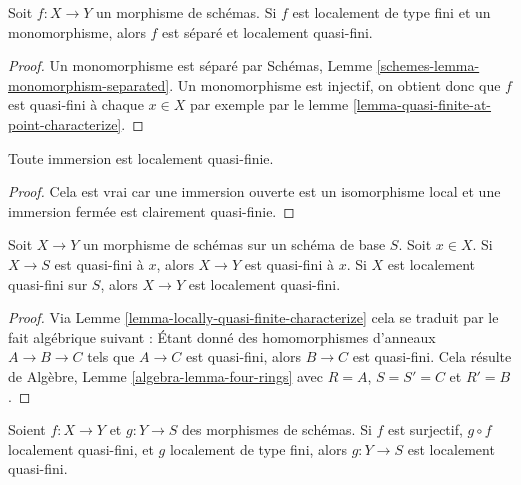\begin{lemma}
\label{lemma-monomorphism-loc-finite-type-loc-quasi-finite}
Soit $f : X \to Y$ un morphisme de schémas. Si $f$
est localement de type fini et un monomorphisme, alors $f$
est séparé et localement quasi-fini.
\end{lemma}

\begin{proof}
Un monomorphisme est séparé par Schémas,
Lemme \ref{schemes-lemma-monomorphism-separated}. Un monomorphisme
est injectif, on obtient donc que
$f$ est quasi-fini à chaque $x \in X$
par exemple par le lemme \ref{lemma-quasi-finite-at-point-characterize}.
\end{proof}

\begin{lemma}
\label{lemma-immersion-locally-quasi-finite}
Toute immersion est localement quasi-finie.
\end{lemma}

\begin{proof}
Cela est vrai car une immersion ouverte est un isomorphisme local et
une immersion fermée est clairement quasi-finie.
\end{proof}

\begin{lemma}
\label{lemma-permanence-quasi-finite}
Soit $X \to Y$ un morphisme de schémas sur un schéma de base $S$. Soit
$x \in X$. Si $X \to S$ est quasi-fini à $x$, alors $X \to Y$
est quasi-fini à $x$. Si $X$
est localement quasi-fini sur $S$, alors $X \to Y$
est localement quasi-fini.
\end{lemma}

\begin{proof}
Via Lemme \ref{lemma-locally-quasi-finite-characterize} cela se traduit par le fait algébrique suivant
: Étant donné des homomorphismes
d'anneaux $A \to B \to C$ tels que $A \to C$ est
quasi-fini, alors $B \to C$ est quasi-fini.
Cela résulte
de Algèbre, Lemme \ref{algebra-lemma-four-rings} avec $R = A$,
$S = S' = C$ et $R' = B$.
\end{proof}

\begin{lemma}
\label{lemma-quasi-finite-local-source}
Soient $f : X \to Y$ et $g : Y \to S$ des morphismes de schémas. Si $f$
est surjectif, $g \circ f$ localement quasi-fini, et $g$
localement de type fini, alors $g : Y \to S$ est localement quasi-fini.
\end{lemma}

